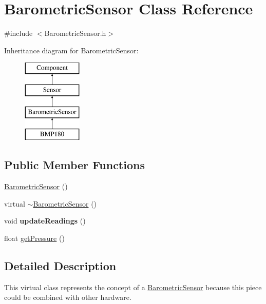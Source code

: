 \hypertarget{classBarometricSensor}{}\section{Barometric\+Sensor Class Reference}
\label{classBarometricSensor}


{\ttfamily \#include $<$Barometric\+Sensor.\+h$>$}

Inheritance diagram for Barometric\+Sensor\+:\begin{figure}[H]
\begin{center}
\leavevmode
\includegraphics[height=4.000000cm]{classBarometricSensor}
\end{center}
\end{figure}
\subsection*{Public Member Functions}
\begin{DoxyCompactItemize}
\item 
\hyperlink{classBarometricSensor_ab61cf4c4713a6f7fa2a29e95096b21f5}{Barometric\+Sensor} ()
\item 
virtual \hyperlink{classBarometricSensor_a17f40d7055700aa4feedc0755485d5d4}{$\sim$\+Barometric\+Sensor} ()
\item 
\hypertarget{classBarometricSensor_a9f7875e4509fb9c57df9eddc76de993e}{}void {\bfseries update\+Readings} ()\label{classBarometricSensor_a9f7875e4509fb9c57df9eddc76de993e}

\item 
float \hyperlink{classBarometricSensor_a7a4c8a68ebf409ea53baf36c9344307f}{get\+Pressure} ()
\end{DoxyCompactItemize}


\subsection{Detailed Description}
This virtual class represents the concept of a \hyperlink{classBarometricSensor}{Barometric\+Sensor} because this piece could be combined with other hardware. 

